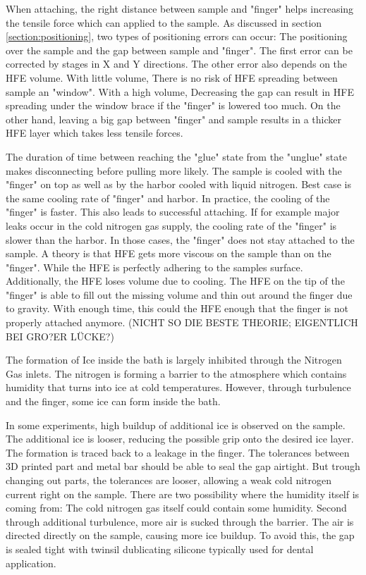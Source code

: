 When attaching, the right distance between sample and "finger" helps increasing the tensile force which can applied to the sample. As discussed in section \ref{section:positioning}, two types of positioning errors can occur: The positioning over the sample and the gap between sample and "finger". The first error can be corrected by stages in X and Y directions. The other error also depends on the HFE volume. With little volume, There is no risk of HFE spreading between sample an "window". With a high volume, Decreasing the gap can result in HFE spreading under the window brace if the "finger" is lowered too much. On the other hand, leaving a big gap between "finger" and sample results in a thicker HFE layer which takes less tensile forces.

The duration of time between reaching the "glue" state from the "unglue" state makes disconnecting before pulling more likely. The sample is cooled with the "finger" on top as well as by the harbor cooled with liquid nitrogen. Best case is the same cooling rate of "finger" and harbor. In practice, the cooling of the "finger" is faster. This also leads to successful attaching. If for example major leaks occur in the cold nitrogen gas supply, the cooling rate of the "finger" is slower than the harbor. In those cases, the "finger" does not stay attached to the sample. A theory is that HFE gets more viscous on the sample than on the "finger". While the HFE is perfectly adhering to the samples surface. Additionally, the HFE loses volume due to cooling. The HFE on the tip of the "finger" is able to fill out the missing volume and thin out around the finger due to gravity. With enough time, this could the HFE enough that the finger is not properly attached anymore. (NICHT SO DIE BESTE THEORIE; EIGENTLICH BEI GRO?ER LÜCKE?)

The formation of Ice inside the bath is largely inhibited through the Nitrogen Gas inlets. The nitrogen is forming a barrier to the atmosphere which contains humidity that turns into ice at cold temperatures. However, through turbulence and the finger, some ice can form inside the bath. 

In some experiments, high buildup of additional ice is observed on the sample. The additional ice is looser, reducing the possible grip onto the desired ice layer. The formation is traced back to a leakage in the finger. The tolerances between 3D printed part and metal bar should be able to seal the gap airtight. But trough changing out parts, the tolerances are looser, allowing a weak cold nitrogen current right on the sample. There are two possibility where the humidity itself is coming from: The cold nitrogen gas itself could contain some humidity. Second through additional turbulence, more air is sucked through the barrier. The air is directed directly on the sample, causing more ice buildup. To avoid this, the gap is sealed tight with twinsil dublicating silicone typically used for dental application.

